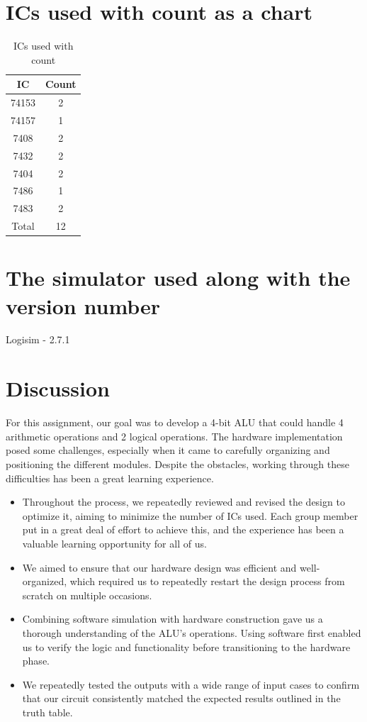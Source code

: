 \documentclass[11pt]{article}
\begin{document}
\section{ICs used with count as a chart}
\begin{table}[ht]
    \centering
    \begin{tabular}{|c|c|}
        \hline
        IC & Count \\
        \hline
        74153 & 2 \\
        \hline
        74157 & 1 \\
        \hline
        7408 & 2 \\
        \hline
        7432 & 2 \\
        \hline
        7404 & 2 \\
        \hline
        7486 & 1 \\
        \hline
        7483 & 2 \\
        \hline
        Total & 12 \\
        \hline
    \end{tabular}
    \caption{ICs used with count}
\end{table}

\section{The simulator used along with the version number}
Logisim - 2.7.1

\pagebreak 

\section{Discussion}

For this assignment, our goal was to develop a 4-bit ALU that could handle 4 arithmetic operations and 2 logical operations. The hardware implementation posed some challenges, especially when it came to carefully organizing and positioning the different modules. Despite the obstacles, working through these difficulties has been a great learning experience.


\begin{itemize}
    \item 
    Throughout the process, we repeatedly reviewed and revised the design to optimize it, aiming to minimize the number of ICs used. Each group member put in a great deal of effort to achieve this, and the experience has been a valuable learning opportunity for all of us.
    \item We aimed to ensure that our hardware design was efficient and well-organized, which required us to repeatedly restart the design process from scratch on multiple occasions.
    \item 
    Combining software simulation with hardware construction gave us a thorough understanding of the ALU's operations. Using software first enabled us to verify the logic and functionality before transitioning to the hardware phase.
    \item We repeatedly tested the outputs with a wide range of input cases to confirm that our circuit consistently matched the expected results outlined in the truth table.
\end{itemize}
\end{document}
